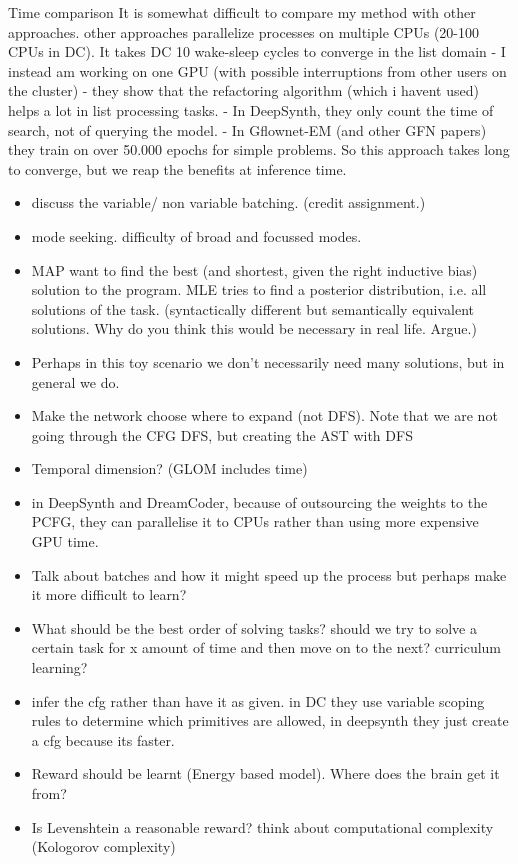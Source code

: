 Time comparison
It is somewhat difficult to compare my method with other approaches.
other approaches parallelize processes on multiple CPUs (20-100 CPUs in DC). It takes DC 10 wake-sleep cycles to converge in the list domain
- I instead am working on one GPU (with possible interruptions from other users on the cluster)
- they show that the refactoring algorithm (which i havent used) helps a lot in list processing tasks.
- In DeepSynth, they only count the time of search, not of querying the model. 
- In Gflownet-EM (and other GFN papers) they train on over 50.000 epochs for simple problems. So this approach takes long to converge, but we reap the benefits at inference time. 


\begin{itemize}
    \item discuss the variable/ non variable batching. (credit assignment.)
    \item mode seeking. difficulty of broad and focussed modes. 
    \item MAP want to find the best (and shortest, given the right inductive bias) solution to the program. MLE tries to find a posterior distribution, i.e. all solutions of the task. (syntactically different but semantically equivalent solutions. Why do you think this would be necessary in real life. Argue.) 
    \item Perhaps in this toy scenario we don't necessarily need many solutions, but in general we do. 
    \item Make the network choose where to expand (not DFS). Note that we are not going through the CFG DFS, but creating the AST with DFS
    \item Temporal dimension? (GLOM includes time)
    \item in DeepSynth and DreamCoder, because of outsourcing the weights to the PCFG, they can parallelise it to CPUs rather than using more expensive GPU time. 
    \item Talk about batches and how it might speed up the process but perhaps make it more difficult to learn?
    \item What should be the best order of solving tasks? should we try to solve a certain task for x amount of time and then move on to the next? curriculum learning? 
    \item infer the cfg rather than have it as given. in DC they use variable scoping rules to determine which primitives are allowed, in deepsynth they just create a cfg because its faster. 
    \item Reward should be learnt (Energy based model). Where does the brain get it from?
    \item Is Levenshtein a reasonable reward? think about computational complexity (Kologorov complexity) 
\end{itemize}


